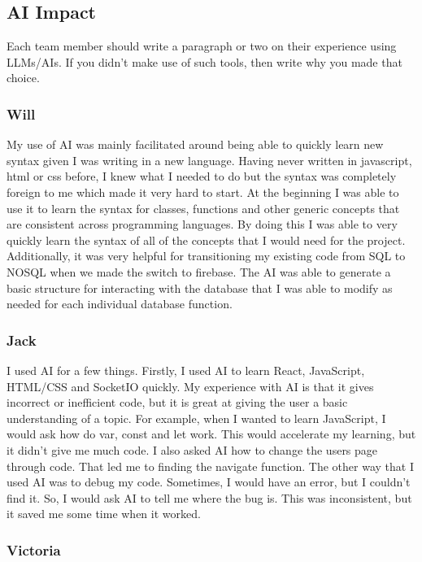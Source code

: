 \subsection{AI Impact}
Each team member should write a paragraph or two on their experience using LLMs/AIs. If
you didn't make use of such tools, then write why you made that choice.

\subsubsection{Will}
My use of AI was mainly facilitated around being able to quickly learn new syntax given I was writing in a new language. Having never written in javascript, html or css before, I knew what I needed to do but the syntax was completely foreign to me which made it very hard to start. At the beginning I was able to use it to learn the syntax for classes, functions and other generic concepts that are consistent across programming languages. By doing this I was able to very quickly learn the syntax of all of the concepts that I would need for the project. Additionally, it was very helpful for transitioning my existing code from SQL to NOSQL when we made the switch to firebase. The AI was able to generate a basic structure for interacting with the database that I was able to modify as needed for each individual database function.

\subsubsection{Jack}
I used AI for a few things. Firstly, I used AI to learn React, JavaScript, HTML/CSS and SocketIO quickly. My experience with AI is that it gives incorrect or inefficient code, but it is great at giving the user a basic understanding of a topic. For example, when I wanted to learn JavaScript, I would ask how do var, const and let work. This would accelerate my learning, but it didn't give me much code. I also asked AI how to change the users page through code. That led me to finding the navigate function. The other way that I used AI was to debug my code. Sometimes, I would have an error, but I couldn't find it. So, I would ask AI to tell me where the bug is. This was inconsistent, but it saved me some time when it worked. 

\subsubsection{Victoria}

